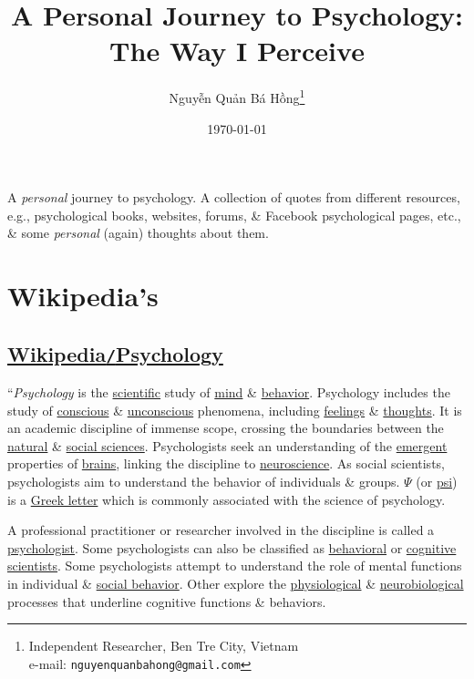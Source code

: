 \documentclass[oneside]{book}
\title{A Personal Journey to Psychology: The Way I Perceive}
\author{\selectlanguage{vietnamese} Nguyễn Quản Bá Hồng\footnote{Independent Researcher, Ben Tre City, Vietnam\\e-mail: \texttt{nguyenquanbahong@gmail.com}}}
\date{\today}
\numberwithin{equation}{section}
\begin{document}
\maketitle
A \textit{personal} journey to psychology. A collection of quotes from different resources, e.g., psychological books, websites, forums, \& Facebook psychological pages, etc., \& some \textit{personal} (again) thoughts about them.
\tableofcontents


\chapter{Wikipedia's}

\section{\href{https://en.wikipedia.org/wiki/Psychology}{Wikipedia\texttt{/}Psychology}}
``\textit{Psychology} is the \href{https://en.wikipedia.org/wiki/Science}{scientific} study of \href{https://en.wikipedia.org/wiki/Mind}{mind} \& \href{https://en.wikipedia.org/wiki/Behavior}{behavior}. Psychology includes the study of \href{https://en.wikipedia.org/wiki/Consciousness}{conscious} \& \href{https://en.wikipedia.org/wiki/Unconscious_mind}{unconscious} phenomena, including \href{https://en.wikipedia.org/wiki/Feeling}{feelings} \& \href{https://en.wikipedia.org/wiki/Thought}{thoughts}. It is an academic discipline of immense scope, crossing the boundaries between the \href{https://en.wikipedia.org/wiki/Natural_science}{natural} \& \href{https://en.wikipedia.org/wiki/Social_science}{social sciences}. Psychologists seek an understanding of the \href{https://en.wikipedia.org/wiki/Emergence}{emergent} properties of \href{https://en.wikipedia.org/wiki/Brain}{brains}, linking the discipline to \href{https://en.wikipedia.org/wiki/Neuroscience}{neuroscience}. As social scientists, psychologists aim to understand the behavior of individuals \& groups. $\Psi$ (or \href{https://en.wikipedia.org/wiki/Psi_(Greek)}{psi}) is a \href{https://en.wikipedia.org/wiki/Greek_alphabet}{Greek letter} which is commonly associated with the science of psychology.

A professional practitioner or researcher involved in the discipline is called a \href{https://en.wikipedia.org/wiki/Psychologist}{psychologist}. Some psychologists can also be classified as \href{https://en.wikipedia.org/wiki/Behavioural_sciences}{behavioral} or \href{https://en.wikipedia.org/wiki/Cognitive_science}{cognitive scientists}. Some psychologists attempt to understand the role of mental functions in individual \& \href{https://en.wikipedia.org/wiki/Social_behavior}{social behavior}. Other explore the \href{https://en.wikipedia.org/wiki/Physiology}{physiological} \& \href{https://en.wikipedia.org/wiki/Nervous_system}{neurobiological} processes that underline cognitive functions \& behaviors.
\end{document}

